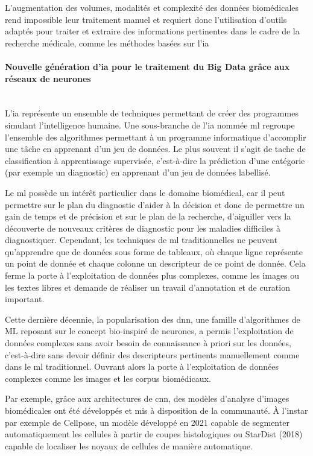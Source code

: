 L’augmentation des volumes, modalités et complexité des données biomédicales rend impossible leur traitement manuel et requiert donc l’utilisation d’outils adaptés pour traiter et extraire des informations pertinentes dans le cadre de la recherche médicale, comme les méthodes basées sur l’\gls{ia}


\paragraph{\textbf{Nouvelle génération d’\gls{ia} pour le traitement du Big Data grâce aux réseaux de neurones}}\mbox{}\\

L’\gls{ia} représente un ensemble de techniques permettant de créer des programmes simulant l’intelligence humaine. Une sous-branche de l’\gls{ia} nommée \gls{ml} regroupe l’ensemble des algorithmes permettant à un programme informatique d’accomplir une tâche en apprenant d’un jeu de données. Le plus souvent il s’agit de tache de classification à apprentissage supervisée, c’est-à-dire la prédiction d’une catégorie (par exemple un diagnostic) en apprenant d’un jeu de données labellisé.

Le \gls{ml} possède un intérêt particulier dans le domaine biomédical, car il peut permettre sur le plan du diagnostic d’aider à la décision et donc de permettre un gain de temps et de précision et sur le plan de la recherche, d’aiguiller vers la découverte de nouveaux critères de diagnostic pour les maladies difficiles à diagnostiquer. Cependant, les techniques de \gls{ml} traditionnelles ne peuvent qu’apprendre que de données sous forme de tableaux, où chaque ligne représente un point de donnée et chaque colonne un descripteur de ce point de donnée. Cela ferme la porte à l’exploitation de données plus complexes, comme les images ou les textes libres et demande de réaliser un travail d’annotation et de curation important.

Cette dernière décennie, la popularisation des \gls{dnn}, une famille d’algorithmes de ML reposant sur le concept bio-inspiré de neurones, a permis l’exploitation de données complexes sans avoir besoin de connaissance à priori sur les données, c’est-à-dire sans devoir définir des descripteurs pertinents manuellement comme dans le \gls{ml} traditionnel. Ouvrant alors la porte à l’exploitation de données complexes comme les images et les corpus biomédicaux.

Par exemple, grâce aux architectures de \gls{cnn}, des modèles d’analyse d’images biomédicales ont été développés et mis à disposition de la communauté. À l’instar par exemple de Cellpose, un modèle développé en 2021 capable de segmenter automatiquement les cellules à partir de coupes histologiques ou StarDist (2018) capable de localiser les noyaux de cellules de manière automatique.


